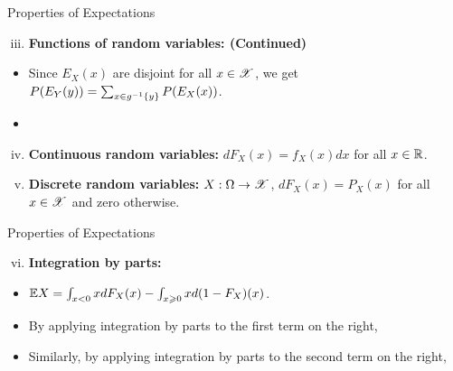 \documentclass[12pt,aspectratio=169]{beamer}
\begin{document}
\begin{frame}{Properties of Expectations}
\begin{Proof}
\begin{enumerate}[(i)]
\setcounter{enumi}{2}
\item <1-> \textbf{Functions of random variables: (Continued)}
\end{enumerate}
\begin{itemize}
\item <1-> Since $E_X(x)$ are disjoint for all $x \in \mathscr{X}$, we get $P(E_Y(y)) = \sum_{x \in g^{-1}\left\{y\right\}}P(E_X(x))$. 
\item <2->   
\end{itemize}
\begin{enumerate}[(i)]
\setcounter{enumi}{3}
\item <3-> \textbf{Continuous random variables:} $dF_X(x) = f_X(x)dx$ for all $x \in \mathbb{R}$.
\item <4-> \textbf{Discrete random variables:} $X : \Omega \to \mathscr{X}$, $dF_X(x) = P_X(x)$ for all $x \in \mathscr{X}$ and zero otherwise. 
\end{enumerate}
\end{Proof}
\end{frame}

\begin{frame}{Properties of Expectations}
\begin{Proof}
\begin{enumerate}[(i)]
\setcounter{enumi}{5}
\item \textbf{Integration by parts:}
\end{enumerate}
\begin{itemize}
\item <1-> $\mathbb{E} X = \int_{x <0}xdF_X(x)-\int_{x \geqslant 0}xd(1-F_X)(x)$. 
\item <2-> By applying integration by parts to the first term on the right,
\item <3-> Similarly, by applying integration by parts to the second term on the right,
\end{itemize}
\end{Proof}
\end{frame}
\end{document}
